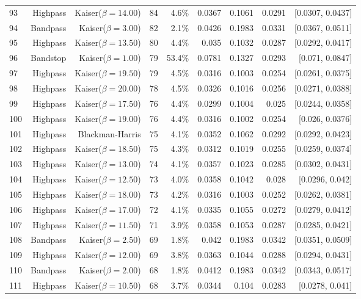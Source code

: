 \begin{longtable}{lrrrrrrrr}
    93 & Highpass & Kaiser($\beta=14.00$) & 84 & 4.6\% & 0.0367 & 0.1061 & 0.0291 & [0.0307, 0.0437] \\
    94 & Bandpass & Kaiser($\beta=3.00$) & 82 & 2.1\% & 0.0426 & 0.1983 & 0.0331 & [0.0367, 0.0511] \\
    95 & Highpass & Kaiser($\beta=13.50$) & 80 & 4.4\% & 0.035 & 0.1032 & 0.0287 & [0.0292, 0.0417] \\
    96 & Bandstop & Kaiser($\beta=1.00$) & 79 & 53.4\% & 0.0781 & 0.1327 & 0.0293 & [0.071, 0.0847] \\
    97 & Highpass & Kaiser($\beta=19.50$) & 79 & 4.5\% & 0.0316 & 0.1003 & 0.0254 & [0.0261, 0.0375] \\
    98 & Highpass & Kaiser($\beta=20.00$) & 78 & 4.5\% & 0.0326 & 0.1016 & 0.0256 & [0.0271, 0.0388] \\
    99 & Highpass & Kaiser($\beta=17.50$) & 76 & 4.4\% & 0.0299 & 0.1004 & 0.025 & [0.0244, 0.0358] \\
    100 & Highpass & Kaiser($\beta=19.00$) & 76 & 4.4\% & 0.0316 & 0.1002 & 0.0254 & [0.026, 0.0376] \\
    101 & Highpass & Blackman-Harris & 75 & 4.1\% & 0.0352 & 0.1062 & 0.0292 & [0.0292, 0.0423] \\
    102 & Highpass & Kaiser($\beta=18.50$) & 75 & 4.3\% & 0.0312 & 0.1019 & 0.0255 & [0.0259, 0.0374] \\
    103 & Highpass & Kaiser($\beta=13.00$) & 74 & 4.1\% & 0.0357 & 0.1023 & 0.0285 & [0.0302, 0.0431] \\
    104 & Highpass & Kaiser($\beta=12.50$) & 73 & 4.0\% & 0.0358 & 0.1042 & 0.028 & [0.0296, 0.042] \\
    105 & Highpass & Kaiser($\beta=18.00$) & 73 & 4.2\% & 0.0316 & 0.1003 & 0.0252 & [0.0262, 0.0381] \\
    106 & Highpass & Kaiser($\beta=17.00$) & 72 & 4.1\% & 0.0335 & 0.1055 & 0.0272 & [0.0279, 0.0412] \\
    107 & Highpass & Kaiser($\beta=11.50$) & 71 & 3.9\% & 0.0358 & 0.1053 & 0.0287 & [0.0285, 0.0421] \\
    108 & Bandpass & Kaiser($\beta=2.50$) & 69 & 1.8\% & 0.042 & 0.1983 & 0.0342 & [0.0351, 0.0509] \\
    109 & Highpass & Kaiser($\beta=12.00$) & 69 & 3.8\% & 0.0363 & 0.1044 & 0.0288 & [0.0294, 0.0431] \\
    110 & Bandpass & Kaiser($\beta=2.00$) & 68 & 1.8\% & 0.0412 & 0.1983 & 0.0342 & [0.0343, 0.0517] \\
    111 & Highpass & Kaiser($\beta=10.50$) & 68 & 3.7\% & 0.0344 & 0.104 & 0.0283 & [0.0278, 0.041] \\

\end{longtable}
